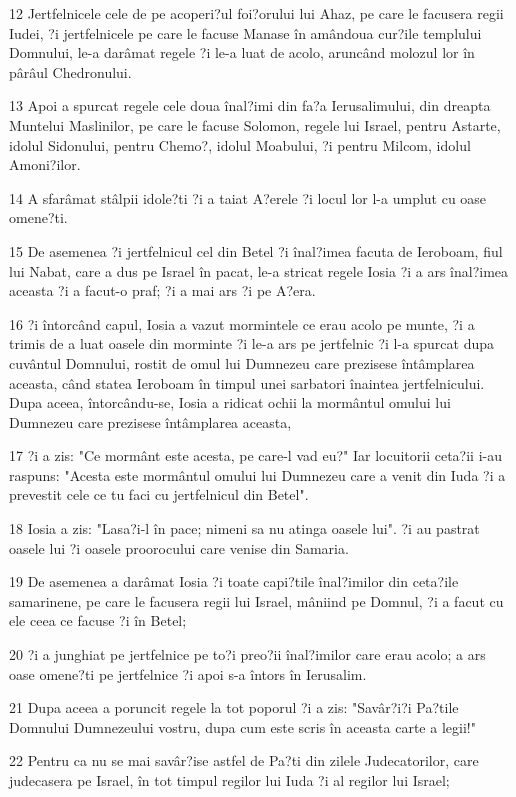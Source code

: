 \par 12 Jertfelnicele cele de pe acoperi?ul foi?orului lui Ahaz, pe care le facusera regii Iudei, ?i jertfelnicele pe care le facuse Manase în amândoua cur?ile templului Domnului, le-a darâmat regele ?i le-a luat de acolo, aruncând molozul lor în pârâul Chedronului.
\par 13 Apoi a spurcat regele cele doua înal?imi din fa?a Ierusalimului, din dreapta Muntelui Maslinilor, pe care le facuse Solomon, regele lui Israel, pentru Astarte, idolul Sidonului, pentru Chemo?, idolul Moabului, ?i pentru Milcom, idolul Amoni?ilor.
\par 14 A sfarâmat stâlpii idole?ti ?i a taiat A?erele ?i locul lor l-a umplut cu oase omene?ti.
\par 15 De asemenea ?i jertfelnicul cel din Betel ?i înal?imea facuta de Ieroboam, fiul lui Nabat, care a dus pe Israel în pacat, le-a stricat regele Iosia ?i a ars înal?imea aceasta ?i a facut-o praf; ?i a mai ars ?i pe A?era.
\par 16 ?i întorcând capul, Iosia a vazut mormintele ce erau acolo pe munte, ?i a trimis de a luat oasele din morminte ?i le-a ars pe jertfelnic ?i l-a spurcat dupa cuvântul Domnului, rostit de omul lui Dumnezeu care prezisese întâmplarea aceasta, când statea Ieroboam în timpul unei sarbatori înaintea jertfelnicului. Dupa aceea, întorcându-se, Iosia a ridicat ochii la mormântul omului lui Dumnezeu care prezisese întâmplarea aceasta,
\par 17 ?i a zis: "Ce mormânt este acesta, pe care-l vad eu?" Iar locuitorii ceta?ii i-au raspuns: "Acesta este mormântul omului lui Dumnezeu care a venit din Iuda ?i a prevestit cele ce tu faci cu jertfelnicul din Betel".
\par 18 Iosia a zis: "Lasa?i-l în pace; nimeni sa nu atinga oasele lui". ?i au pastrat oasele lui ?i oasele proorocului care venise din Samaria.
\par 19 De asemenea a darâmat Iosia ?i toate capi?tile înal?imilor din ceta?ile samarinene, pe care le facusera regii lui Israel, mâniind pe Domnul, ?i a facut cu ele ceea ce facuse ?i în Betel;
\par 20 ?i a junghiat pe jertfelnice pe to?i preo?ii înal?imilor care erau acolo; a ars oase omene?ti pe jertfelnice ?i apoi s-a întors în Ierusalim.
\par 21 Dupa aceea a poruncit regele la tot poporul ?i a zis: "Savâr?i?i Pa?tile Domnului Dumnezeului vostru, dupa cum este scris în aceasta carte a legii!"
\par 22 Pentru ca nu se mai savâr?ise astfel de Pa?ti din zilele Judecatorilor, care judecasera pe Israel, în tot timpul regilor lui Iuda ?i al regilor lui Israel;
